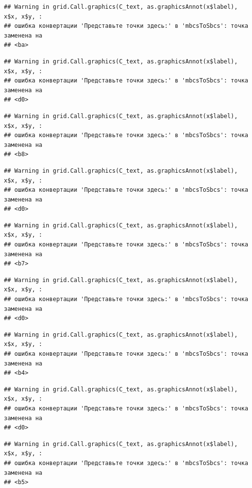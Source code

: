 \documentclass[]{book}
\begin{document}
\begin{verbatim}
## Warning in grid.Call.graphics(C_text, as.graphicsAnnot(x$label), x$x, x$y, :
## ошибка конвертации 'Представьте точки здесь:' в 'mbcsToSbcs': точка заменена на
## <ba>
\end{verbatim}

\begin{verbatim}
## Warning in grid.Call.graphics(C_text, as.graphicsAnnot(x$label), x$x, x$y, :
## ошибка конвертации 'Представьте точки здесь:' в 'mbcsToSbcs': точка заменена на
## <d0>
\end{verbatim}

\begin{verbatim}
## Warning in grid.Call.graphics(C_text, as.graphicsAnnot(x$label), x$x, x$y, :
## ошибка конвертации 'Представьте точки здесь:' в 'mbcsToSbcs': точка заменена на
## <b8>
\end{verbatim}

\begin{verbatim}
## Warning in grid.Call.graphics(C_text, as.graphicsAnnot(x$label), x$x, x$y, :
## ошибка конвертации 'Представьте точки здесь:' в 'mbcsToSbcs': точка заменена на
## <d0>
\end{verbatim}

\begin{verbatim}
## Warning in grid.Call.graphics(C_text, as.graphicsAnnot(x$label), x$x, x$y, :
## ошибка конвертации 'Представьте точки здесь:' в 'mbcsToSbcs': точка заменена на
## <b7>
\end{verbatim}

\begin{verbatim}
## Warning in grid.Call.graphics(C_text, as.graphicsAnnot(x$label), x$x, x$y, :
## ошибка конвертации 'Представьте точки здесь:' в 'mbcsToSbcs': точка заменена на
## <d0>
\end{verbatim}

\begin{verbatim}
## Warning in grid.Call.graphics(C_text, as.graphicsAnnot(x$label), x$x, x$y, :
## ошибка конвертации 'Представьте точки здесь:' в 'mbcsToSbcs': точка заменена на
## <b4>
\end{verbatim}

\begin{verbatim}
## Warning in grid.Call.graphics(C_text, as.graphicsAnnot(x$label), x$x, x$y, :
## ошибка конвертации 'Представьте точки здесь:' в 'mbcsToSbcs': точка заменена на
## <d0>
\end{verbatim}

\begin{verbatim}
## Warning in grid.Call.graphics(C_text, as.graphicsAnnot(x$label), x$x, x$y, :
## ошибка конвертации 'Представьте точки здесь:' в 'mbcsToSbcs': точка заменена на
## <b5>
\end{verbatim}
\end{document}
